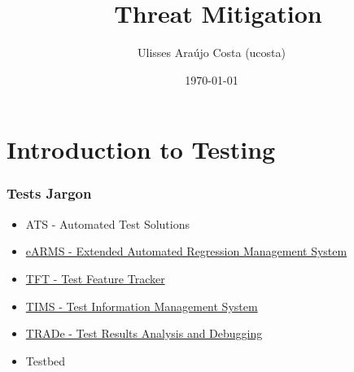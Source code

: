 \documentclass{beamer}
\title{\sfpm~Threat Mitigation}
\author{Ulisses Ara\'ujo Costa (ucosta)}
\date{\today}
\institute{Cisco Systems Inc.}
\begin{document}
\begin{frame}
   \titlepage
\end{frame}


\section{Introduction to Testing}

\begin{frame} \frametitle{Tests Jargon}
\begin{itemize}
    \item ATS - Automated Test Solutions
    \item \href{http://earms-app.cisco.com/server/earms}{eARMS - Extended Automated Regression Management System}\\
    \item \href{http://tft.cisco.com/run-search.cmd?search=8607691}{TFT - Test Feature Tracker}\\
    \item \href{http://tims.cisco.com/browsing.cmd?proj=91\&folder=95370}{TIMS - Test Information Management System}\\
    \item \href{http://earms-trade.cisco.com/tradeui/dashboardviewer.faces?ats=/auto/stg-devtest/ucosta/ats5.1.0}{TRADe - Test Results Analysis and Debugging}\\
    \item Testbed
\end{itemize}
\begin{center}
\end{center}
\end{frame}
\end{document}
